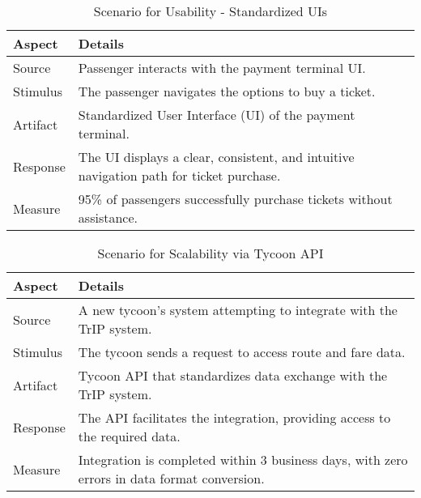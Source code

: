 \begin{table}[H]
    \centering
    \begin{tabularx}{\textwidth}{@{} lX @{}}
    \toprule
    \textbf{Aspect} & \textbf{Details} \\
    \midrule
    Source & Passenger interacts with the payment terminal UI. \\
    Stimulus & The passenger navigates the options to buy a ticket. \\
    Artifact & Standardized User Interface (UI) of the payment terminal. \\
    Response & The UI displays a clear, consistent, and intuitive navigation path for ticket purchase. \\
    Measure & 95\% of passengers successfully purchase tickets without assistance. \\
    \bottomrule
    \end{tabularx}
    \caption{Scenario for Usability - Standardized UIs}
    \label{table:usability_enhancement}
\end{table}


\begin{table}[H]
    \centering
    \begin{tabularx}{\textwidth}{@{} lX @{}}
    \toprule
    \textbf{Aspect} & \textbf{Details} \\
    \midrule
    Source & A new tycoon's system attempting to integrate with the TrIP system. \\
    Stimulus & The tycoon sends a request to access route and fare data. \\
    Artifact & Tycoon API that standardizes data exchange with the TrIP system. \\
    Response & The API facilitates the integration, providing access to the required data. \\
    Measure & Integration is completed within 3 business days, with zero errors in data format conversion. \\
    \bottomrule
    \end{tabularx}
    \caption{Scenario for Scalability via Tycoon API}
    \label{table:scalability_tycoon_api}
\end{table}


